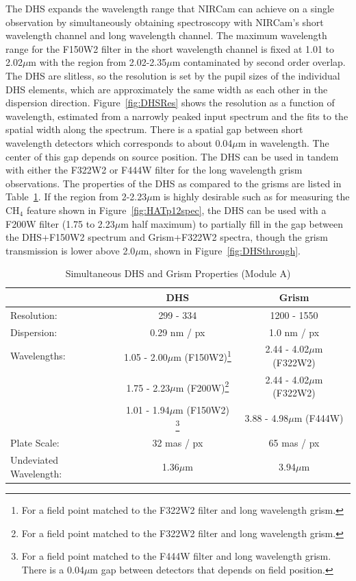 \documentclass[iop]{emulateapj}
\newcommand{\DHSres}{299 - 334}
\newcommand{\DHSgap}{0.04}
\begin{document}
The DHS expands the wavelength range that NIRCam can achieve on a single observation by simultaneously obtaining spectroscopy with NIRCam's short wavelength channel and long wavelength channel.
The maximum wavelength range for the F150W2 filter in the short wavelength channel is fixed at 1.01 to 2.02$\mu$m with the region from 2.02-2.35$\mu$m contaminated by second order overlap.
The DHS are slitless, so the resolution is set by the pupil sizes of the individual DHS elements, which are approximately the same width as each other in the dispersion direction.
Figure~\ref{fig:DHSRes} shows the resolution as a function of wavelength, estimated from a narrowly peaked input spectrum and the fits to the spatial width along the spectrum.
There is a spatial gap between short wavelength detectors which corresponds to about \DHSgap$\mu$m in wavelength.
The center of this gap depends on source position.
The DHS can be used in tandem with either the F322W2 or F444W filter for the long wavelength grism observations.
The properties of the DHS as compared to the grisms are listed in Table~\ref{tab:DHSgprop}.
If the region from 2-2.23$\mu$m is highly desirable such as for measuring the CH$_4$ feature shown in Figure~\ref{fig:HATp12spec}, the DHS can be used with a F200W filter (1.75 to 2.23$\mu$m half maximum) to partially fill in the gap between the DHS+F150W2 spectrum and Grism+F322W2 spectra, though the grism transmission is lower above 2.0$\mu$m, shown in Figure~\ref{fig:DHSthrough}. 

\begin{table}
\centering
\caption{Simultaneous DHS and Grism Properties (Module A)}\label{tab:DHSgprop}
\begin{tabular}{lcc}
\hline \hline
 & DHS & Grism \\
\hline \hline		
Resolution: &  \DHSres & 1200 - 1550 \\
Dispersion: & 0.29 nm / px & 1.0 nm / px \\
Wavelengths: & 1.05 - 2.00$\mu$m (F150W2)\footnote{For a field point matched to the F322W2 filter and long wavelength grism.} & 2.44 - 4.02$\mu$m (F322W2)\\
			 & 1.75 - 2.23$\mu$m (F200W)\footnote{For a field point matched to the F322W2 filter and long wavelength grism.} & 2.44 - 4.02$\mu$m (F322W2)\\
			& 	1.01 - 1.94$\mu$m (F150W2) \footnote{For a field point matched to the F444W filter and long wavelength grism. There is a \DHSgap$\mu$m gap between detectors that depends on field position.}	& 3.88 - 4.98$\mu$m (F444W) \\
Plate Scale: & 32 mas / px  &  65 mas / px\\
Undeviated Wavelength: & 1.36$\mu$m & 3.94$\mu$m   \\
\hline
\end{tabular}
\end{table}
\end{document}
